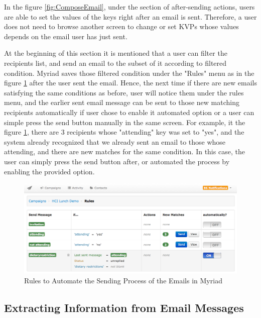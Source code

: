 In the figure \ref{fig:ComposeEmail}, under the section of after-sending actions, users are able to set the values of the keys right after an email is sent. Therefore, a user does not need to browse another screen to change or set \ac{KVP}s whose values depends on the email user has just sent.
\vspace{1cm}

At the beginning of this section it is mentioned that a user can filter the recipients list, and send an email to the subset of it according to filtered condition. Myriad saves those filtered condition under the "Rules" menu as in the figure \ref{fig:AutomatedRules} after the user sent the email. Hence, the next time if there are new emails satisfying the same conditions as before, user will notice them under the rules menu, and the earlier sent email message can be sent to those new matching recipients automatically if user chose to enable it automated option or a user can simple press the send button manually in the same screen. For example, it the figure \ref{fig:AutomatedRules}, there are 3 recipients whose "attending" key was set to "yes", and the system already recognized that we already sent an email to those whose attending, and there are new matches for the same condition. In this case, the user can simply press the send button after, or automated the process by enabling the provided option.

\begin{figure}[htbp]
	\centering
	\includegraphics[width=1.00\textwidth]{imgs/AutomatedRules.png}
	\caption[Rules to Automate the Sending Process of the Emails in Myriad]{Rules to Automate the Sending Process of the Emails in Myriad}
	\label{fig:AutomatedRules}
\end{figure}

\subsection{Extracting Information from Email Messages}
\label{subsec:5.2.5:ExtrInfoEmaiMess}

